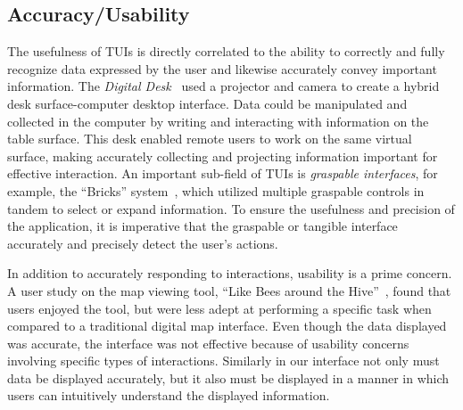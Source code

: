 \documentclass[review]{vgtc}                 %
\begin{document}
\subsection{Accuracy/Usability}

The usefulness of TUIs is directly correlated to the ability to
correctly and fully recognize data expressed by the user and likewise
accurately convey important information.
%
The \emph{Digital Desk}~\cite{159630}
used a projector and camera to create a hybrid desk
surface-computer desktop interface.  Data could be manipulated and
collected in the computer by writing and interacting with information
on the table surface.  This desk enabled remote users to work on
the same virtual surface, making accurately collecting and projecting information 
important for effective interaction.
%
An important sub-field of TUIs is 
{\em graspable interfaces}, for example, 
the ``Bricks''
system~\cite{223964}, which utilized multiple graspable controls
in tandem to select or expand information.  
To ensure the usefulness and precision of the application, it is
imperative that the graspable or tangible interface accurately and
precisely detect the user's actions.

In addition to accurately responding to interactions, usability is a
prime concern.  A user study on the map viewing tool, ``Like Bees
around the Hive''~\cite{1518991}, found that users enjoyed the
tool, but were less adept at performing a specific task
when compared to a traditional digital map interface.  Even though
the data displayed was
accurate, the interface was not effective because of usability
concerns involving specific types of interactions.  Similarly in our interface not only must data be
displayed accurately, but it also must be displayed in a manner in
which users can intuitively understand the displayed information.



%
\end{document}
